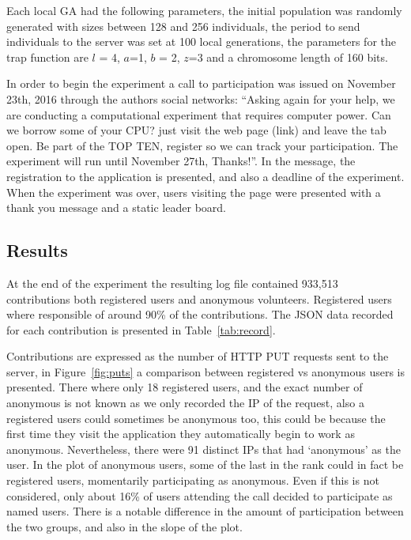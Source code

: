\documentclass{llncs}
\begin{document}
Each local GA had the following parameters, the initial population was randomly generated 
with sizes between 128 and 256 individuals, the period to send individuals to the server
was set at 100 local generations, the parameters for the trap function are $l$ = 4,
$a$=1, $b$ = 2, $z$=3 and a chromosome length of 160 bits.

In order to begin the experiment a call to participation was issued on November 23th, 
2016 through the authors social networks:
``Asking again for your help, we are conducting a computational experiment
that requires computer power. Can we borrow some of your CPU? just visit the web page (link)
and leave the tab open. Be part of the TOP TEN, register so we can track your participation.
The experiment will run until November 27th, Thanks!''. In the message, the registration
to the application is presented, and also a deadline of the experiment. When the
experiment was over, users visiting the page were presented with a thank you message 
and a static leader board. 

\subsection{Results}
\label{sec:results}
At the end of the experiment the resulting log file contained 933,513 contributions both 
registered users and anonymous volunteers. Registered users where responsible of around
90\% of the contributions. The JSON data recorded for each contribution is  presented 
in Table~\ref{tab:record}.  

Contributions are expressed as the number of HTTP PUT requests sent to the server, 
in Figure~\ref{fig:puts} a comparison between registered vs anonymous users is 
presented. There where only 18 registered users, and the exact number of anonymous
is not known as we only recorded the IP of the request, also a registered users 
could sometimes be anonymous too, this could be because the first time they visit
the application they automatically begin to work as anonymous. Nevertheless,
there were 91 distinct IPs that had `anonymous' as the user. In the plot of
anonymous users, some of the last in the rank could in fact be registered users, 
momentarily participating as anonymous. Even if this is not considered, only 
about 16\% of users attending the call decided to participate as named users. 
There is a notable difference in the amount of participation between the two
groups, and also in the slope of the plot.  
\end{document}
